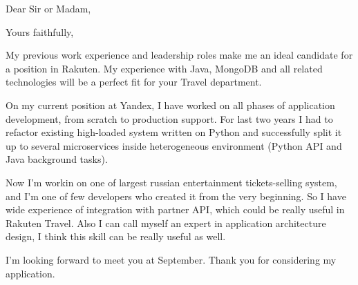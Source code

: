 \documentclass[11pt,a4paper,sans]{moderncv}        %
\begin{document}

\clearpage
\date{July 30, 2017}
\opening{Dear Sir or Madam,}
\closing{Yours faithfully,}
\makelettertitle

My previous work experience and leadership roles make me an ideal candidate for a position in Rakuten. My experience with Java, MongoDB and all related technologies will be a perfect fit for your Travel department.

On my current position at Yandex, I have worked on all phases of application development, from scratch to production support. For last two years I had to refactor existing high-loaded system written on Python and successfully split it up to several microservices inside heterogeneous environment (Python API and Java background tasks).

Now I'm workin on one of largest russian entertainment tickets-selling system, and I'm one of few developers who created it from the very beginning. So I have wide experience of integration with partner API, which could be really useful in Rakuten Travel. Also I can call myself an expert in application architecture design, I think this skill can be really useful as well.

I'm looking forward to meet you at September. Thank you for considering my application.

\makeletterclosing

\end{document}
